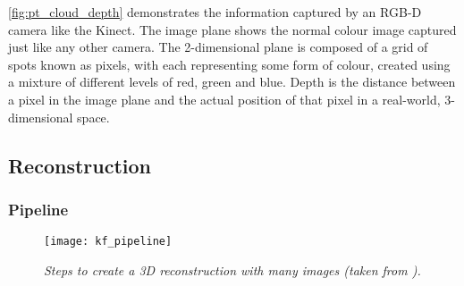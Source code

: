 \autoref{fig:pt_cloud_depth} demonstrates the information captured by an RGB-D camera like the Kinect. The image plane shows the normal colour image captured just like any other camera. The 2-dimensional plane is composed of a grid of spots known as pixels, with each representing some form of colour, created using a mixture of different levels of red, green and blue. Depth is the distance between a pixel in the image plane and the actual position of that pixel in a real-world, 3-dimensional space.

\subsection{Reconstruction}
\subsubsection{Pipeline}

\begin{figure}
  \centering
  \texttt{[image: kf\_pipeline]}
  \caption{\textit{Steps to create a 3D reconstruction with many images (taken from \protect\cite{kinect-doc}).}}
  \label{fig:k-means}
\end{figure}


